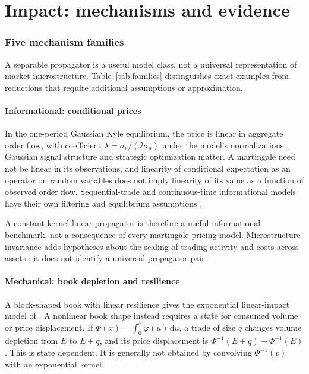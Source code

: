 \documentclass[11pt]{article}
\numberwithin{equation}{section}
\theoremstyle{definition}
\theoremstyle{remark}
\theoremstyle{definition}
\newcommand{\dd}{\,\mathrm d}
\begin{document}
\part{Impact: mechanisms and evidence}\label{pt:lit}


\section{Five mechanism families}\label{sec:families}

A separable propagator is a useful model class, not a universal representation of
market microstructure. Table~\ref{tab:families} distinguishes exact examples from
reductions that require additional assumptions or approximation.

\subsection{Informational: conditional prices}

In the one-period Gaussian Kyle equilibrium, the price is linear in aggregate
order flow, with coefficient $\lambda=\sigma_v/(2\sigma_u)$ under the model's
normalizations \citep{kyle1985}. Gaussian signal structure and strategic
optimization matter. A martingale need not be linear in its observations, and
linearity of conditional expectation as an operator on random variables does
not imply linearity of its value as a function of observed order flow.
Sequential-trade and continuous-time informational models have their own
filtering and equilibrium assumptions \citep{glostenmilgrom1985,back1992}.

A constant-kernel linear propagator is therefore a useful informational benchmark,
not a consequence of every martingale-pricing model. Microstructure invariance
adds hypotheses about the scaling of trading activity and costs across assets
\citep{kyleobizhaeva2016}; it does not identify a universal propagator pair.

\subsection{Mechanical: book depletion and resilience}

A block-shaped book with linear resilience gives the exponential linear-impact
model of \citet{obizhaevawang2013}. A nonlinear book shape instead requires a
state for consumed volume or price displacement. If
$\Phi(x)=\int_0^x\varphi(u)\dd u$, a trade of size $q$ changes volume depletion
from $E$ to $E+q$, and its price displacement is
$\Phi^{-1}(E+q)-\Phi^{-1}(E)$. This is state dependent. It is generally not
obtained by convolving $\Phi^{-1}(v)$ with an exponential kernel.
\end{document}
